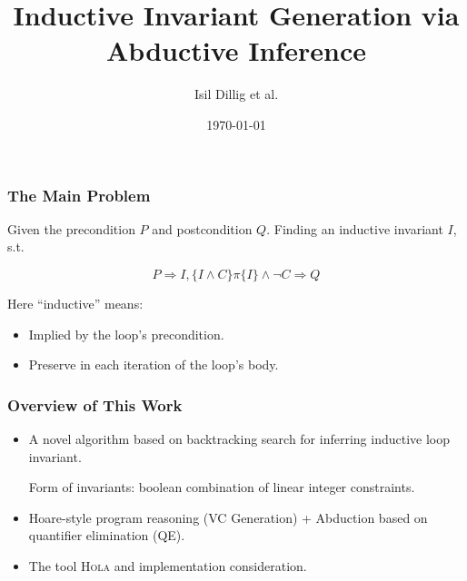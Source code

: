 \documentclass[11pt]{beamer}
\title{Inductive Invariant Generation via Abductive Inference}
\author{Isil Dillig et al.}
\date{\today}
\begin{document}
\maketitle
\begin{frame}\frametitle{The Main Problem}
\begin{definition}
Given the precondition $P$ and postcondition $Q$. Finding an inductive invariant $I$, s.t.

\[P\Longrightarrow I, \{I\wedge C\}\pi\{I\} \wedge \neg C \Longrightarrow Q\]

\end{definition}

Here ``inductive'' means:
\begin{itemize}
\item Implied by the loop's precondition.
\item Preserve in each iteration of the loop's body.

\end{itemize}
\end{frame}

\begin{frame}\frametitle{Overview of This Work}
\begin{itemize}
\item A novel algorithm based on backtracking search for inferring inductive loop invariant. 

Form of invariants: boolean combination of linear integer constraints.

\item Hoare-style program reasoning (VC Generation) + Abduction based on quantifier elimination (QE).

\item The tool \textsc{Hola} and implementation consideration.
\end{itemize}

\end{frame}
\end{document}

